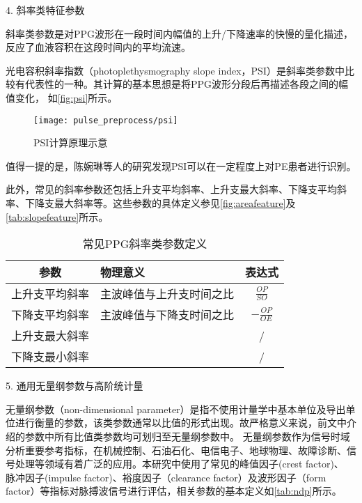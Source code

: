 4. 斜率类特征参数

斜率类参数是对PPG波形在一段时间内幅值的上升/下降速率的快慢的量化描述，反应了血液容积在这段时间内的平均流速。

光电容积斜率指数（photoplethysmography slope index，PSI）是斜率类参数中比较有代表性的一种\cite{Chen2019}。其计算的基本思想是将PPG波形分段后再描述各段之间的幅值变化，
如\autoref{fig:psi}所示。
\begin{figure}[htbp]
    \centering
    \texttt{[image: pulse\_preprocess/psi]}
    \caption[PSI计算原理示意]{\label{fig:psi}PSI计算原理示意\cite{Chen2019}}
\end{figure}
值得一提的是，陈婉琳等人的研究发现PSI可以在一定程度上对PE患者进行识别\cite{Chen2019}。

此外，常见的斜率参数还包括上升支平均斜率、上升支最大斜率、下降支平均斜率、下降支最大斜率等。这些参数的具体定义参见\autoref{fig:areafeature}及\autoref{tab:slopefeature}所示。
\begin{table}[htbp]
    \centering
    \caption{\label{tab:slopefeature}常见PPG斜率类参数定义}
    \begin{tabularx}{\linewidth}{cX<{\centering}c}
    \toprule
    \textbf{参数} & \textbf{物理意义} & \textbf{表达式} \\
    \midrule
    上升支平均斜率      &  主波峰值与上升支时间之比         &  $\frac{OP}{SO}$\\
    下降支平均斜率      &  主波峰值与下降支时间之比         &  $-\frac{OP}{OE}$\\
    上升支最大斜率      &           &  /\\
    下降支最小斜率      &           &   /    \\
    \bottomrule
    \end{tabularx}
\end{table}

5. 通用无量纲参数与高阶统计量

无量纲参数（non-dimensional parameter）是指不使用计量学中基本单位及导出单位进行衡量的参数，该类参数通常以比值的形式出现。故严格意义来说，前文中介绍的参数中所有比值类参数均可划归至无量纲参数中。
无量纲参数作为信号时域分析重要参考指标，在机械控制、石油石化、电信电子、地球物理、故障诊断、信号处理等领域有着广泛的应用\cite{Jardine2006,Guo2014,Tu2013,Mendel1991}。本研究中使用了常见的峰值因子(crest factor)、
脉冲因子(impulse factor)、裕度因子（clearance factor）及波形因子（form factor）等指标对脉搏波信号进行评估，相关参数的基本定义如\autoref{tab:ndp}所示。

